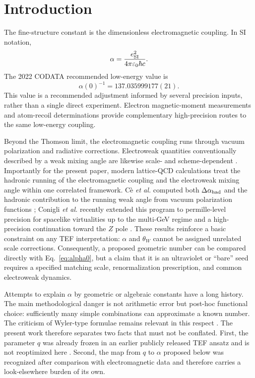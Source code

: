 \documentclass[10pt,twocolumn]{article}
\begin{document}
\section{Introduction}

The fine-structure constant is the dimensionless electromagnetic coupling.  In SI notation,
\begin{equation}
\alpha=\frac{e_{\rm SI}^2}{4\pi\varepsilon_0\hbar c}.
\end{equation}
The 2022 CODATA recommended low-energy value is \cite{Mohr2025,NISTalpha}
\begin{equation}
\alpha(0)^{-1}=137.035999177(21).
\label{eq:alpha0}
\end{equation}
This value is a recommended adjustment informed by several precision inputs, rather than a
single direct experiment.  Electron magnetic-moment measurements and atom-recoil determinations
provide complementary high-precision routes to the same low-energy coupling.

Beyond the Thomson limit, the electromagnetic coupling runs through vacuum polarization and
radiative corrections.  Electroweak quantities conventionally described by a weak mixing angle
are likewise scale- and scheme-dependent \cite{PDG2026}.  Importantly for the present paper,
modern lattice-QCD calculations treat the hadronic running of the electromagnetic coupling and the
electroweak mixing angle within one correlated framework.  C\`e \emph{et al.} computed both
$\Delta\alpha_{\rm had}$ and the hadronic contribution to the running weak angle from vacuum
polarization functions \cite{Ce2022}; Conigli \emph{et al.} recently extended this program to
permille-level precision for spacelike virtualities up to the multi-GeV regime and a high-precision
continuation toward the $Z$ pole \cite{Conigli2026}.  These results reinforce a basic constraint on
any TEF interpretation: $\alpha$ and $\theta_W$ cannot be assigned unrelated scale corrections.
Consequently, a proposed geometric number can be compared directly with Eq.~\eqref{eq:alpha0},
but a claim that it is an ultraviolet or ``bare'' seed requires a specified matching scale,
renormalization prescription, and common electroweak dynamics.

Attempts to explain $\alpha$ by geometric or algebraic constants have a long history.  The main
methodological danger is not arithmetic error but post-hoc functional choice: sufficiently many
simple combinations can approximate a known number.  The criticism of Wyler-type formulae
remains relevant in this respect \cite{Robertson1971}.  The present work therefore separates two
facts that must not be conflated.  First, the parameter $q$ was already frozen in an earlier publicly
released TEF ansatz and is not reoptimized here \cite{WuCompanion}.  Second, the map from $q$ to
$\alpha$ proposed below was recognized after comparison with electromagnetic data and therefore
carries a look-elsewhere burden of its own.
\end{document}
